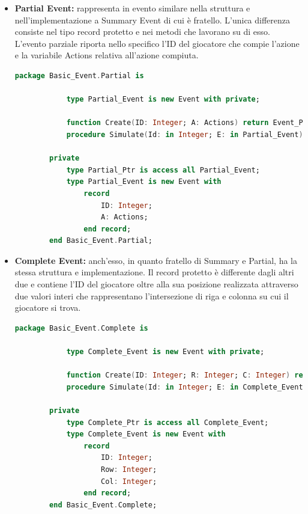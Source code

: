 \documentclass[aps,letterpaper,10pt]{article}
\begin{document}
\begin{itemize}
\begin{itemize}
	\end{itemize}
	
	\begin{itemize}
		\item \textbf{Partial Event:} rappresenta in evento similare nella struttura e nell'implementazione a Summary Event di cui \`e fratello. L'unica differenza consiste nel tipo record protetto e nei metodi che lavorano su di esso. L'evento parziale riporta nello specifico l'ID del giocatore che compie l'azione e la variabile Actions relativa all'azione compiuta.
		
		\begin{lstlisting}[language=Ada]
		package Basic_Event.Partial is
    
		    type Partial_Event is new Event with private;
	
			function Create(ID: Integer; A: Actions) return Event_Ptr; 
		    procedure Simulate(Id: in Integer; E: in Partial_Event);

		private
		    type Partial_Ptr is access all Partial_Event; 
		    type Partial_Event is new Event with
		        record
		            ID: Integer;
		            A: Actions;
		        end record;
		end Basic_Event.Partial;
		\end{lstlisting}
	\end{itemize}
	
	\begin{itemize}
		\item \textbf{Complete Event:} anch'esso, in quanto fratello di Summary e Partial, ha la stessa struttura e implementazione. Il record protetto \`e differente dagli altri due e contiene l'ID del giocatore oltre alla sua posizione realizzata attraverso due valori interi che rappresentano l'intersezione di riga e colonna su cui il giocatore si trova.
		
		\begin{lstlisting}[language=Ada]
		package Basic_Event.Complete is
    
		    type Complete_Event is new Event with private;
	
		    function Create(ID: Integer; R: Integer; C: Integer) return Event_Ptr; 
		    procedure Simulate(Id: in Integer; E: in Complete_Event);

		private
		    type Complete_Ptr is access all Complete_Event; 
		    type Complete_Event is new Event with
		        record
		            ID: Integer;
		            Row: Integer;
		            Col: Integer;
		        end record;
		end Basic_Event.Complete;
		\end{lstlisting}	
	\end{itemize}
	
\end{itemize}
\end{document}

